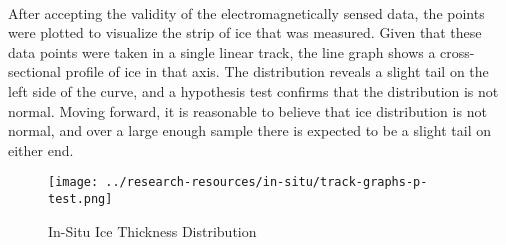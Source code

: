 \paragraph*{}
After accepting the validity of the electromagnetically sensed data, the points were plotted to visualize the strip of ice that was measured. Given that these data points were taken in a single linear track, the line graph shows a cross-sectional profile of ice in that axis. The distribution reveals a slight tail on the left side of the curve, and a hypothesis test confirms that the distribution is not normal. Moving forward, it is reasonable to believe that ice distribution is not normal, and over a large enough sample there is expected to be a slight tail on either end.
\par
\begin{figure}[htb]
	\centering
	\texttt{[image: ../research-resources/in-situ/track-graphs-p-test.png]}
	\caption{In-Situ Ice Thickness Distribution}
	\label{fig:p-test-aug}
\end{figure}
